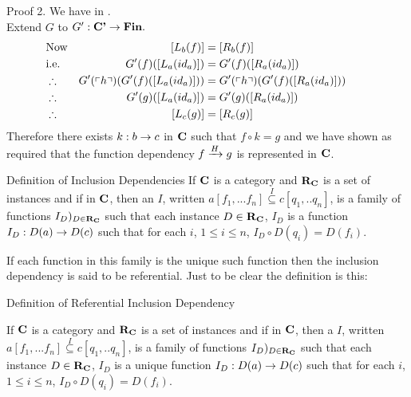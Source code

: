 \begin{frame}{Proof 2.}
We have   in \catcp.\\
\medskip
Extend $G$ to $G':\catcp \morph \Fin.$ \\

\medskip
\begin{align*}
&\mbox{Now} & [L_b(f)]                         &= [R_b(f)]                 \\
&\mbox{i.e.}& G'(f)([L_a(id_a)])              &= G'(f)([R_a(id_a)])       \\
&\therefore & G'(\qq{h}) (G'(f)([L_a(id_a)])) &= G'(\qq{h}) (G'(f)([R_a(id_a)])) \\
&\therefore & G'(g)([L_a(id_a)])              &= G'(g)([R_a(id_a)]) & &    \\
&\therefore & [L_c(g)]                        &= [R_c(g)] 
\end{align*}
Therefore there exists $k:b \morph c$ in 
$\catc$ such that $f \circ k = g$ and we have shown as required that the function dependency
$\fundep{H}{f}{g}$ is represented in $\catc$.
\end{frame}


\begin{frame}{Definition of Inclusion Dependencies}
If $\catc$ is a category and $\reqtc$ is a set of instances 
and if
\fnsourceqnsource
in $\catc$, then an  $I$, written $a[f_1,...f_n] \overset{I}{\subseteq} c[q_1,..q_n]$, is a family of functions $I_D)_{D \in \reqtc}$
such that each instance $D \in \reqtc$, $I_D$ is a function $I_D : D(a) \morph D(c)$ such that
for each $i$, $1 \leq i \le n$, $I_D \circ D(q_i) = D(f_i)$.

If each function in this family is the unique such function then the inclusion dependency is said to be referential. Just to be clear the definition is this:
\end{frame}

\begin{frame}{Definition of Referential Inclusion Dependency}
\begin{definition}
If $\catc$ is a category and $\reqtc$ is a set of instances 
and if
\fnsourceqnsource
in $\catc$, then a  $I$, written $a[f_1,...f_n] \overset{I}{\subseteq} c[q_1,..q_n]$, is a family of functions $I_D)_{D \in \reqtc}$
such that each instance $D \in \reqtc$, $I_D$ is a unique function $I_D : D(a) \morph D(c)$ such that
for each $i$, $1 \leq i \le n$, $I_D \circ D(q_i) = D(f_i)$.
\end{definition}
\end{frame}

